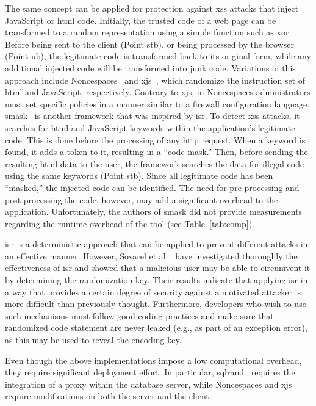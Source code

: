 \documentclass[10pt,journal,compsoc]{IEEEtran}
\begin{document}
The same concept can be applied for protection against
{\sc xss} attacks that inject JavaScript or {\sc html} code.
Initially, the trusted code of a web page can be transformed
to a random representation using a simple function such as {\sc xor}.
Before being sent to the client (Point {\sc s}t{\sc b}),
or being processed by the browser (Point {\sc ub}),
the legitimate code is transformed back to its original form,
while any additional injected code will be transformed into junk code.
Variations of this approach include
Noncespaces~\cite{GC09} and x{\sc js}~\cite{APKLM10}, which
randomize the instruction set of {\sc html} and JavaScript,
respectively. Contrary to x{\sc js}, in Noncespaces administrators
must set specific policies in a manner similar to a firewall
configuration language. {\sc sm}ask~\cite{JB07} is another
framework that was inspired by {\sc isr}. To detect {\sc xss}
attacks, it searches for {\sc html} and
JavaScript keywords within the application's legitimate code. This is
done before the processing of any {\sc http} request. When a keyword is found,
it adds a token to it, resulting in a ``code mask.'' Then, before
sending the resulting {\sc html} data to the user, the framework
searches the data for illegal code using the same keywords (Point
{\sc s}t{\sc b}). Since all legitimate code has been ``masked,'' the injected
code can be identified. The need for 
pre-processing and post-processing the code,
however, may add a significant overhead to the application.
Unfortunately, the authors of {\sc sm}ask did not provide measurements
regarding the runtime overhead of the tool (see
Table~\ref{tab:comp}).

{\sc isr} is a deterministic approach that can be applied to prevent
different attacks in an effective manner. However, Sovarel et
al.~\cite{SEP05} have investigated thoroughly the effectiveness of
{\sc isr} and showed that a malicious user may be able to circumvent
it by determining the randomization key. Their results indicate
that applying {\sc isr} in a way that provides a certain degree of
security against a motivated attacker is more difficult than
previously thought. Furthermore, developers who wish to use such
mechanisms must follow good coding practices and make sure that
randomized code statement are never leaked
(e.g., as part of an exception error),
as this may be used to reveal the encoding key.

Even though the above implementations impose a low computational
overhead, they require significant deployment effort. In particular,
{\sc sql}rand~\cite{BK04} requires the integration of
a proxy within the database
server, while Noncespaces and x{\sc js}~\cite{APKLM10}
require modifications on both the server and the client.
\end{document}
